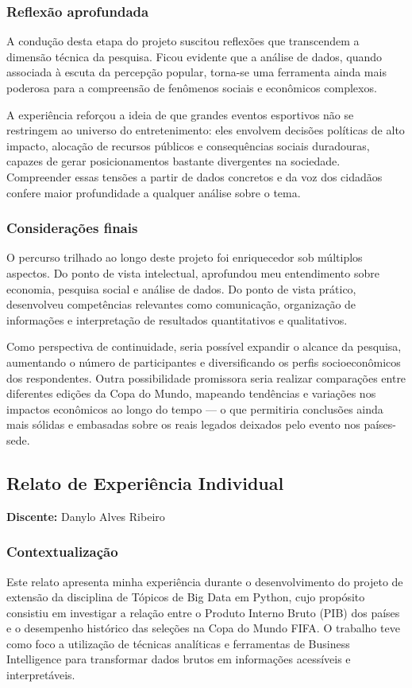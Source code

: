 \documentclass[12pt, a4paper, brazil]{article}
\begin{document}
\subsubsection{Reflexão aprofundada}
A condução desta etapa do projeto suscitou reflexões que transcendem a dimensão técnica da pesquisa. Ficou evidente que a análise de dados, quando associada à escuta da percepção popular, torna-se uma ferramenta ainda mais poderosa para a compreensão de fenômenos sociais e econômicos complexos.

A experiência reforçou a ideia de que grandes eventos esportivos não se restringem ao universo do entretenimento: eles envolvem decisões políticas de alto impacto, alocação de recursos públicos e consequências sociais duradouras, capazes de gerar posicionamentos bastante divergentes na sociedade. Compreender essas tensões a partir de dados concretos e da voz dos cidadãos confere maior profundidade a qualquer análise sobre o tema.

\subsubsection{Considerações finais}
O percurso trilhado ao longo deste projeto foi enriquecedor sob múltiplos aspectos. Do ponto de vista intelectual, aprofundou meu entendimento sobre economia, pesquisa social e análise de dados. Do ponto de vista prático, desenvolveu competências relevantes como comunicação, organização de informações e interpretação de resultados quantitativos e qualitativos. 

Como perspectiva de continuidade, seria possível expandir o alcance da pesquisa, aumentando o número de participantes e diversificando os perfis socioeconômicos dos respondentes. Outra possibilidade promissora seria realizar comparações entre diferentes edições da Copa do Mundo, mapeando tendências e variações nos impactos econômicos ao longo do tempo — o que permitiria conclusões ainda mais sólidas e embasadas sobre os reais legados deixados pelo evento nos países-sede.

\subsection{Relato de Experiência Individual}
\textbf{Discente:} Danylo Alves Ribeiro

\subsubsection{Contextualização}
Este relato apresenta minha experiência durante o desenvolvimento do projeto de extensão da disciplina de Tópicos de Big Data em Python, cujo propósito consistiu em investigar a relação entre o Produto Interno Bruto (PIB) dos países e o desempenho histórico das seleções na Copa do Mundo FIFA. O trabalho teve como foco a utilização de técnicas analíticas e ferramentas de Business Intelligence para transformar dados brutos em informações acessíveis e interpretáveis. 
\end{document}
